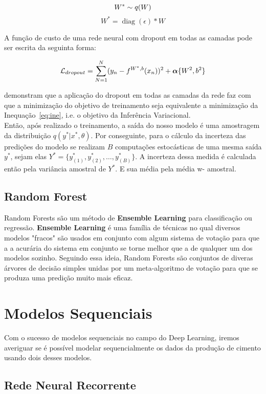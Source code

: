 \newcommand{\diag}{\mathop{\mathrm{diag}}}

$$    W^*   \sim \mathnormal{q}(W) $$
$$    W^*  = \diag(\epsilon) * W $$


A função de custo de uma rede neural com dropout em todas as camadas pode ser escrita da seguinta forma:

\[     \mathcal{L}_{dropout} = \sum^N_{N=1} (y_n - \mathnormal{f}^{W^*,b}(x_n))^2 + \boldsymbol{\alpha}\{W^2,b^2\} \]


\cite{dropbayes} demonstram que a aplicação do dropout em todas as camadas da rede faz com que a minimização
do objetivo de treinamento seja equivalente a minimização da Inequação~\ref{eq:ine}, i.e. o objetivo da Inferência Variacional.\\

Então, após realizado o treinamento, a saída do nosso modelo é uma amostragem da distribuição $q(y^* | x^* , \theta)$.
Por conseguinte, para o cálculo da incerteza das predições do modelo se realizam $B$ computações estocásticas de uma mesma
saída $y^*$, sejam elas $Y^* = \{y^*_{(1)},y^*_{(2)}, \dots , y^*_{(B)}\}$. A incerteza
dessa medida é calculada então pela variância amostral de $Y^*$. E sua média pela média w- amostral.



\subsection{Random Forest}

Random Forests são um método de \textbf{Ensemble Learning} para classificação ou regressão. \textbf{Ensemble Learning} é uma família de técnicas no qual diversos modelos "fracos" são usados em conjunto com algum sistema de votação para que a a acurária do sistema em conjunto se torne melhor que a de qualquer um dos modelos sozinho. Seguindo essa ideia, Random Forests são conjuntos de diveras árvores de decisão simples unidas por um meta-algoritmo de votação para que se produza uma predição muito mais eficaz.


\section{Modelos Sequenciais}
Com o sucesso de modelos sequenciais no campo do Deep Learning, iremos averiguar se é possível modelar sequencialmente os dados da produção de cimento usando dois desses modelos. 
\\

\subsection{Rede Neural Recorrente}
% 

